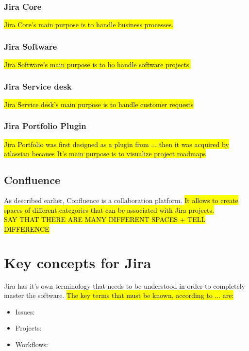 		\subsubsection{Jira Core}
			\hl{Jira Core's main purpose is to handle business processes.}
			
		\subsubsection{Jira Software}
			\hl{Jira Software's main purpose is to ho handle software projects.}
		
		\subsubsection{Jira Service desk}
			\hl{Jira Service desk's main purpose is to handle customer requests}

		\subsubsection{Jira Portfolio Plugin}
			\hl{Jira Portfolio was first designed as a plugin from ... then it was acquired by atlassian becaues
			It's main purpose is to visualize project roadmaps}
		
	\subsection{Confluence}
		As described earlier, Confluence is a collaboration platform.
		\hl{It allows to create spaces of different categories that can be associated with Jira projects.\\SAY THAT THERE ARE MANY DIFFERENT SPACES + TELL DIFFERENCE}
		
		
\section{Key concepts for Jira}
	Jira has it's own terminology that needs to be understood in order to completely master the software.	
	\hl{The key terms that must be known, according to ... are:}
	\begin{itemize}
		\item Issues: 
		\item Projects: 
		\item Workflows: 
	\end{itemize}
	
